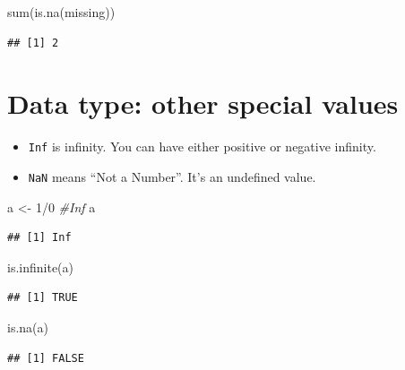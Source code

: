 \documentclass[
  11pt,
]{book}
\newenvironment{Shaded}{\begin{snugshade}}{\end{snugshade}}
\newcommand{\CommentTok}[1]{\textcolor[rgb]{0.56,0.35,0.01}{\textit{#1}}}
\newcommand{\DecValTok}[1]{\textcolor[rgb]{0.00,0.00,0.81}{#1}}
\newcommand{\FunctionTok}[1]{\textcolor[rgb]{0.00,0.00,0.00}{#1}}
\newcommand{\NormalTok}[1]{#1}
\newcommand{\OtherTok}[1]{\textcolor[rgb]{0.56,0.35,0.01}{#1}}
\newcommand{\SpecialCharTok}[1]{\textcolor[rgb]{0.00,0.00,0.00}{#1}}
\begin{document}
\begin{Shaded}
\begin{Highlighting}[]
\FunctionTok{sum}\NormalTok{(}\FunctionTok{is.na}\NormalTok{(missing))}
\end{Highlighting}
\end{Shaded}

\begin{verbatim}
## [1] 2
\end{verbatim}

\hypertarget{data-type-other-special-values}{%
\section{Data type: other special values}\label{data-type-other-special-values}}

\begin{itemize}
\item
  \texttt{Inf} is infinity. You can have either positive or negative infinity.
\item
  \texttt{NaN} means ``Not a Number''. It's an undefined value.
\end{itemize}

\begin{Shaded}
\begin{Highlighting}[]
\NormalTok{a }\OtherTok{\textless{}{-}} \DecValTok{1}\SpecialCharTok{/}\DecValTok{0} \CommentTok{\#Inf}
\NormalTok{a}
\end{Highlighting}
\end{Shaded}

\begin{verbatim}
## [1] Inf
\end{verbatim}

\begin{Shaded}
\begin{Highlighting}[]
\FunctionTok{is.infinite}\NormalTok{(a)}
\end{Highlighting}
\end{Shaded}

\begin{verbatim}
## [1] TRUE
\end{verbatim}

\begin{Shaded}
\begin{Highlighting}[]
\FunctionTok{is.na}\NormalTok{(a)}
\end{Highlighting}
\end{Shaded}

\begin{verbatim}
## [1] FALSE
\end{verbatim}
\end{document}
